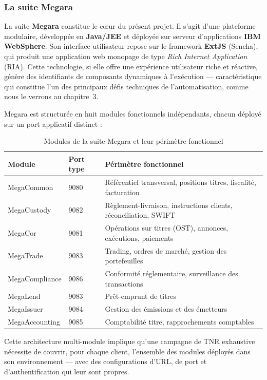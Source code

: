 \documentclass[12pt, a4paper]{report}
\begin{document}
\subsubsection{La suite Megara}

La suite \textbf{Megara} constitue le c\oe{}ur du présent projet. Il s'agit d'une plateforme modulaire, développée en \textbf{Java/JEE} et déployée sur serveur d'applications \textbf{IBM WebSphere}. Son interface utilisateur repose sur le framework \textbf{ExtJS} (Sencha), qui produit une application web monopage de type \textit{Rich Internet Application} (RIA). Cette technologie, si elle offre une expérience utilisateur riche et réactive, génère des identifiants de composants dynamiques à l'exécution — caractéristique qui constitue l'un des principaux défis techniques de l'automatisation, comme nous le verrons au chapitre~3.

Megara est structurée en huit modules fonctionnels indépendants, chacun déployé sur un port applicatif distinct :

\begin{table}[H]
\centering
\caption{Modules de la suite Megara et leur périmètre fonctionnel}
\label{tab:modules}
\begin{tabularx}{\textwidth}{llX}
\toprule
\textbf{Module}       & \textbf{Port type} & \textbf{Périmètre fonctionnel} \\
\midrule
MegaCommon      & 9080 & Référentiel transversal, positions titres, fiscalité, facturation \\
MegaCustody     & 9082 & Règlement-livraison, instructions clients, réconciliation, SWIFT \\
MegaCor         & 9081 & Opérations sur titres (OST), annonces, exécutions, paiements \\
MegaTrade       & 9083 & Trading, ordres de marché, gestion des portefeuilles \\
MegaCompliance  & 9086 & Conformité réglementaire, surveillance des transactions \\
MegaLend        & 9083 & Prêt-emprunt de titres \\
MegaIssuer      & 9084 & Gestion des émissions et des émetteurs \\
MegaAccounting  & 9085 & Comptabilité titre, rapprochements comptables \\
\bottomrule
\end{tabularx}
\end{table}

Cette architecture multi-module implique qu'une campagne de TNR exhaustive nécessite de couvrir, pour chaque client, l'ensemble des modules déployés dans son environnement — avec des configurations d'URL, de port et d'authentification qui leur sont propres.
\end{document}
